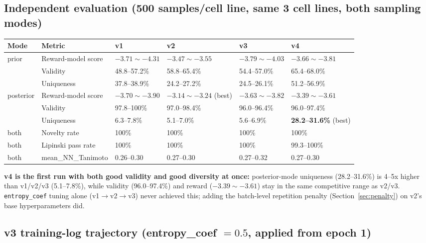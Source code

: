 \documentclass[11pt]{article}
\newcommand{\code}[1]{\texttt{#1}}
\begin{document}
\subsection{Independent evaluation (500 samples/cell line, same 3 cell lines, both sampling modes)}
\label{sec:eval_v1v4}

\begin{center}
\small
\begin{tabular}{@{}l l l l l l@{}}
\toprule
\textbf{Mode} & \textbf{Metric} & \textbf{v1} & \textbf{v2} & \textbf{v3} & \textbf{v4} \\
\midrule
prior & Reward-model score & $-3.71\sim-4.31$ & $-3.47\sim-3.55$ & $-3.79\sim-4.03$ & $-3.66\sim-3.81$ \\
 & Validity & 48.8--57.2\% & 58.8--65.4\% & 54.4--57.0\% & 65.4--68.0\% \\
 & Uniqueness & 37.8--38.9\% & 24.2--27.2\% & 24.5--26.1\% & 51.2--56.9\% \\
posterior & Reward-model score & $-3.70\sim-3.90$ & $-3.14\sim-3.24$ (best) & $-3.63\sim-3.82$ & $-3.39\sim-3.61$ \\
 & Validity & 97.8--100\% & 97.0--98.4\% & 96.0--96.4\% & 96.0--97.4\% \\
 & Uniqueness & 6.3--7.8\% & 5.1--7.0\% & 5.6--6.9\% & \textbf{28.2--31.6\%} (best) \\
both & Novelty rate & 100\% & 100\% & 100\% & 100\% \\
both & Lipinski pass rate & 100\% & 100\% & 100\% & 99.3--100\% \\
both & mean\_NN\_Tanimoto & 0.26--0.30 & 0.27--0.30 & 0.27--0.32 & 0.27--0.30 \\
\bottomrule
\end{tabular}
\end{center}

\textbf{v4 is the first run with both good validity and good diversity at once:} posterior-mode uniqueness (28.2--31.6\%) is 4--5x higher than v1/v2/v3 (5.1--7.8\%), while validity (96.0--97.4\%) and reward ($-3.39\sim-3.61$) stay in the same competitive range as v2/v3. \code{entropy\_coef} tuning alone (v1$\to$v2$\to$v3) never achieved this; adding the batch-level repetition penalty (Section~\ref{sec:penalty}) on v2's base hyperparameters did.

\subsection{v3 training-log trajectory (entropy\_coef $=0.5$, applied from epoch 1)}
\label{sec:v3traj}
\end{document}
